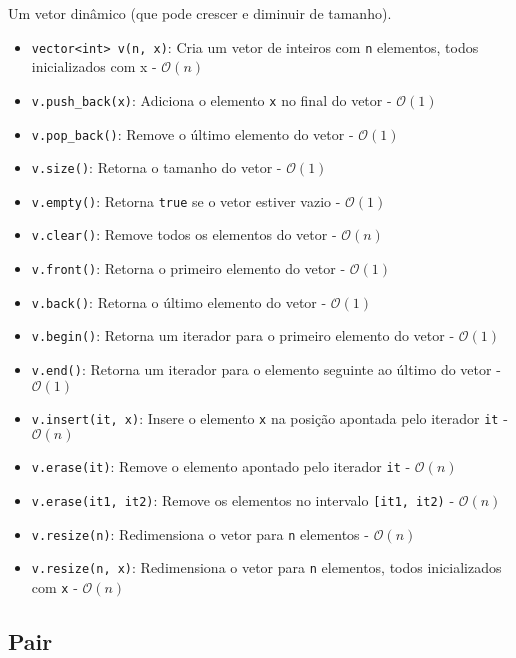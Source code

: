 Um vetor dinâmico (que pode crescer e diminuir de tamanho).

\begin{itemize}
    \item \texttt{vector<int> v(n, x)}: Cria um vetor de inteiros com \texttt{n} elementos, todos inicializados com x - $\mathcal{O}(n)$
    \item \texttt{v.push\_back(x)}: Adiciona o elemento \texttt{x} no final do vetor - $\mathcal{O}(1)$
    \item \texttt{v.pop\_back()}: Remove o último elemento do vetor - $\mathcal{O}(1)$
    \item \texttt{v.size()}: Retorna o tamanho do vetor - $\mathcal{O}(1)$
    \item \texttt{v.empty()}: Retorna \texttt{true} se o vetor estiver vazio - $\mathcal{O}(1)$
    \item \texttt{v.clear()}: Remove todos os elementos do vetor - $\mathcal{O}(n)$
    \item \texttt{v.front()}: Retorna o primeiro elemento do vetor - $\mathcal{O}(1)$
    \item \texttt{v.back()}: Retorna o último elemento do vetor - $\mathcal{O}(1)$
    \item \texttt{v.begin()}: Retorna um iterador para o primeiro elemento do vetor - $\mathcal{O}(1)$
    \item \texttt{v.end()}: Retorna um iterador para o elemento seguinte ao último do vetor - $\mathcal{O}(1)$
    \item \texttt{v.insert(it, x)}: Insere o elemento \texttt{x} na posição apontada pelo iterador \texttt{it} - $\mathcal{O}(n)$
    \item \texttt{v.erase(it)}: Remove o elemento apontado pelo iterador \texttt{it} - $\mathcal{O}(n)$
    \item \texttt{v.erase(it1, it2)}: Remove os elementos no intervalo \texttt{[it1, it2)} - $\mathcal{O}(n)$
    \item \texttt{v.resize(n)}: Redimensiona o vetor para \texttt{n} elementos - $\mathcal{O}(n)$
    \item \texttt{v.resize(n, x)}: Redimensiona o vetor para \texttt{n} elementos, todos inicializados com \texttt{x} - $\mathcal{O}(n)$
\end{itemize}

\subsection{Pair}

